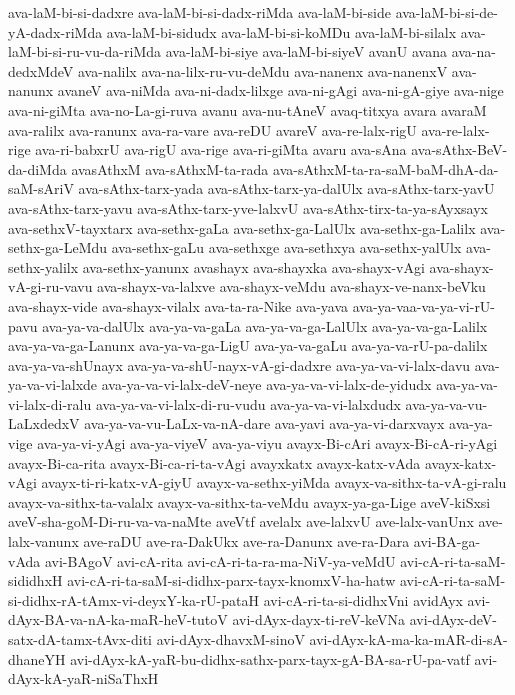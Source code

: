 {ava-laM-bi-si-dadxre
ava-laM-bi-si-dadx-riMda
ava-laM-bi-side
ava-laM-bi-si-de-yA-dadx-riMda
ava-laM-bi-sidudx
ava-laM-bi-si-koMDu
ava-laM-bi-silalx
ava-laM-bi-si-ru-vu-da-riMda
ava-laM-bi-siye
ava-laM-bi-siyeV
avanU
avana
ava-na-dedxMdeV
ava-nalilx
ava-na-lilx-ru-vu-deMdu
ava-nanenx
ava-nanenxV
ava-nanunx
avaneV
ava-niMda
ava-ni-dadx-lilxge
ava-ni-gAgi
ava-ni-gA-giye
ava-nige
ava-ni-giMta
ava-no-La-gi-ruva
avanu
ava-nu-tAneV
avaq-titxya
avara
avaraM
ava-ralilx
ava-ranunx
ava-ra-vare
ava-reDU
avareV
ava-re-lalx-rigU
ava-re-lalx-rige
ava-ri-babxrU
ava-rigU
ava-rige
ava-ri-giMta
avaru
ava-sAna
ava-sAthx-BeV-da-diMda
avasAthxM
ava-sAthxM-ta-rada
ava-sAthxM-ta-ra-saM-baM-dhA-da-saM-sAriV
ava-sAthx-tarx-yada
ava-sAthx-tarx-ya-dalUlx
ava-sAthx-tarx-yavU
ava-sAthx-tarx-yavu
ava-sAthx-tarx-yve-lalxvU
ava-sAthx-tirx-ta-ya-sAyxsayx
ava-sethxV-tayxtarx
ava-sethx-gaLa
ava-sethx-ga-LalUlx
ava-sethx-ga-Lalilx
ava-sethx-ga-LeMdu
ava-sethx-gaLu
ava-sethxge
ava-sethxya
ava-sethx-yalUlx
ava-sethx-yalilx
ava-sethx-yanunx
avashayx
ava-shayxka
ava-shayx-vAgi
ava-shayx-vA-gi-ru-vavu
ava-shayx-va-lalxve
ava-shayx-veMdu
ava-shayx-ve-nanx-beVku
ava-shayx-vide
ava-shayx-vilalx
ava-ta-ra-Nike
ava-yava
ava-ya-vaa-va-ya-vi-rU-pavu
ava-ya-va-dalUlx
ava-ya-va-gaLa
ava-ya-va-ga-LalUlx
ava-ya-va-ga-Lalilx
ava-ya-va-ga-Lanunx
ava-ya-va-ga-LigU
ava-ya-va-gaLu
ava-ya-va-rU-pa-dalilx
ava-ya-va-shUnayx
ava-ya-va-shU-nayx-vA-gi-dadxre
ava-ya-va-vi-lalx-davu
ava-ya-va-vi-lalxde
ava-ya-va-vi-lalx-deV-neye
ava-ya-va-vi-lalx-de-yidudx
ava-ya-va-vi-lalx-di-ralu
ava-ya-va-vi-lalx-di-ru-vudu
ava-ya-va-vi-lalxdudx
ava-ya-va-vu-LaLxdedxV
ava-ya-va-vu-LaLx-va-nA-dare
ava-yavi
ava-ya-vi-darxvayx
ava-ya-vige
ava-ya-vi-yAgi
ava-ya-viyeV
ava-ya-viyu
avayx-Bi-cAri
avayx-Bi-cA-ri-yAgi
avayx-Bi-ca-rita
avayx-Bi-ca-ri-ta-vAgi
avayxkatx
avayx-katx-vAda
avayx-katx-vAgi
avayx-ti-ri-katx-vA-giyU
avayx-va-sethx-yiMda
avayx-va-sithx-ta-vA-gi-ralu
avayx-va-sithx-ta-valalx
avayx-va-sithx-ta-veMdu
avayx-ya-ga-Lige
aveV-kiSxsi
aveV-sha-goM-Di-ru-va-va-naMte
aveVtf
avelalx
ave-lalxvU
ave-lalx-vanUnx
ave-lalx-vanunx
ave-raDU
ave-ra-DakUkx
ave-ra-Danunx
ave-ra-Dara
avi-BA-ga-vAda
avi-BAgoV
avi-cA-rita
avi-cA-ri-ta-ra-ma-NiV-ya-veMdU
avi-cA-ri-ta-saM-sididhxH
avi-cA-ri-ta-saM-si-didhx-parx-tayx-knomxV-ha-hatw
avi-cA-ri-ta-saM-si-didhx-rA-tAmx-vi-deyxY-ka-rU-pataH
avi-cA-ri-ta-si-didhxVni
avidAyx
avi-dAyx-BA-va-nA-ka-maR-heV-tutoV
avi-dAyx-dayx-ti-reV-keVNa
avi-dAyx-deV-satx-dA-tamx-tAvx-diti
avi-dAyx-dhavxM-sinoV
avi-dAyx-kA-ma-ka-mAR-di-sA-dhaneYH
avi-dAyx-kA-yaR-bu-didhx-sathx-parx-tayx-gA-BA-sa-rU-pa-vatf
avi-dAyx-kA-yaR-niSaThxH
}
